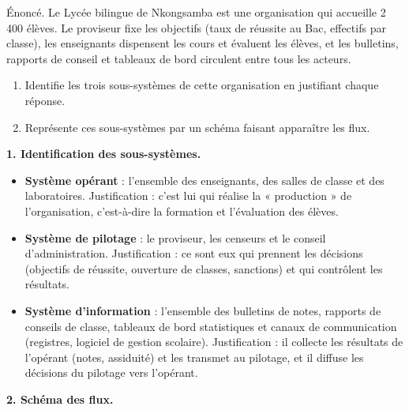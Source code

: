 \documentclass[11pt]{article}
\begin{document}
\begin{exoresolu}
Énoncé. Le Lycée bilingue de Nkongsamba est une organisation qui accueille 2 400 élèves. Le proviseur fixe les objectifs (taux de réussite au Bac, effectifs par classe), les enseignants dispensent les cours et évaluent les élèves, et les bulletins, rapports de conseil et tableaux de bord circulent entre tous les acteurs.
\begin{enumerate}
\item Identifie les trois sous-systèmes de cette organisation en justifiant chaque réponse.
\item Représente ces sous-systèmes par un schéma faisant apparaître les flux.
\end{enumerate}
\tcblower
\textbf{1. Identification des sous-systèmes.}
\begin{itemize}
\item \textbf{Système opérant} : l'ensemble des enseignants, des salles de classe et des laboratoires. Justification : c'est lui qui réalise la « production » de l'organisation, c'est-à-dire la formation et l'évaluation des élèves.
\item \textbf{Système de pilotage} : le proviseur, les censeurs et le conseil d'administration. Justification : ce sont eux qui prennent les décisions (objectifs de réussite, ouverture de classes, sanctions) et qui contrôlent les résultats.
\item \textbf{Système d'information} : l'ensemble des bulletins de notes, rapports de conseils de classe, tableaux de bord statistiques et canaux de communication (registres, logiciel de gestion scolaire). Justification : il collecte les résultats de l'opérant (notes, assiduité) et les transmet au pilotage, et il diffuse les décisions du pilotage vers l'opérant.
\end{itemize}
\textbf{2. Schéma des flux.}
\begin{popfigure}
\begin{center}
\end{center}
\end{popfigure}
\end{exoresolu}
\end{document}
